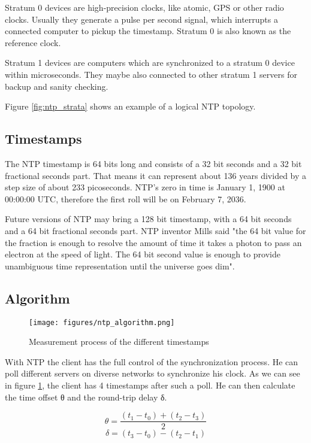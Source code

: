 Stratum 0 devices are high-precision clocks, like atomic, GPS or other radio clocks. Usually they generate a pulse per second signal, which interrupts a connected computer to pickup the timestamp. Stratum 0 is also known as the reference clock.

Stratum 1 devices are computers which are synchronized to a stratum 0 device within microseconds. They maybe also connected to other stratum 1 servers for backup and sanity checking.

Figure \ref{fig:ntp_strata} shows an example of a logical NTP topology.

\subsection{Timestamps}

The NTP timestamp is 64 bits long and consists of a 32 bit seconds and a 32 bit fractional seconds part. That means it can represent about 136 years divided by a step size of about 233 picoseconds. NTP’s zero in time is January 1, 1900 at 00:00:00 UTC, therefore the first roll will be on February 7, 2036.

Future versions of NTP may bring a 128 bit timestamp, with a 64 bit seconds and a 64 bit fractional seconds part. NTP inventor Mills said "the 64 bit value for the fraction is enough to resolve the amount of time it takes a photon to pass an electron at the speed of light. The 64 bit second value is enough to provide unambiguous time representation until the universe goes dim".

\subsection{Algorithm}

\begin{figure}[tb]
	\centering
	\texttt{[image: figures/ntp\_algorithm.png]}
	\caption{Measurement process of the different timestamps}
	\label{fig:ntp_algorithm}
\end{figure}

With NTP the client has the full control of the synchronization process. He can poll different servers on diverse networks to synchronize his clock. As we can see in figure \ref{fig:ntp_algorithm}, the client has 4 timestamps after such a poll. He can then calculate the time offset θ and the round-trip delay δ.

\[ \theta = \frac{(t_1 - t_0) + (t_2 - t_3)}{2} \]
\[ \delta = (t_3 - t_0) - (t_2 - t_1) \]

